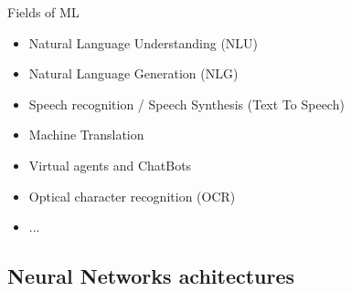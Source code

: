 \documentclass[10pt,serif,mathserif,compress,hyperref={colorlinks}]{beamer}
\begin{document}

\begin{frame}{Fields of ML}

  \begin{tcolorbox}[title=Natural Language Processing: NLP]
    \begin{itemize}
    \item<1-> Natural Language Understanding (NLU) 
    \item<1-> Natural Language Generation (NLG)
    \item<1-> Speech recognition / Speech Synthesis (Text To Speech)
    \item<1-> Machine Translation
    \item<1-> Virtual agents and ChatBots
    \item<1-> Optical character recognition (OCR)
    \item<1-> ...
    \end{itemize}
  \end{tcolorbox}   
  
\end{frame}

\subsection{Neural Networks achitectures}

\end{document}
